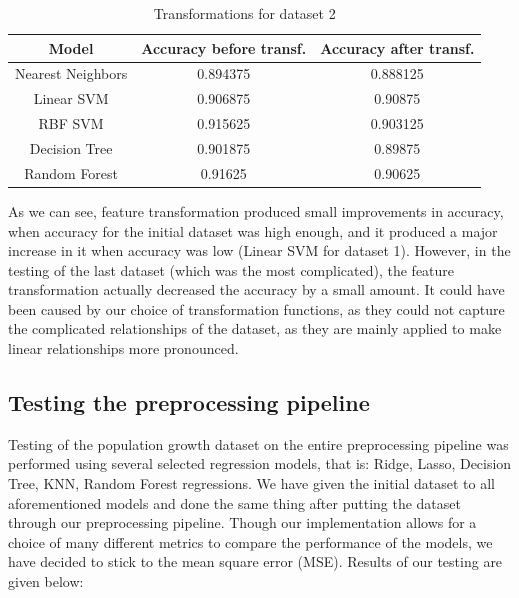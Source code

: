 \documentclass[conference]{IEEEtran}
\begin{document}
\begin{table}[htbp]
	\caption{Transformations for dataset 2}
	\begin{center}
		\begin{tabular}{|c|c|c|}
			\hline
			\textbf{Model}&\textbf{Accuracy before transf.}&\textbf{Accuracy after transf.} \\
			\hline
			Nearest Neighbors&0.894375&0.888125 \\
			\hline
			Linear SVM&0.906875&0.90875 \\
			\hline
			RBF SVM&0.915625&0.903125 \\
			\hline
			Decision Tree&0.901875&0.89875 \\
			\hline
			Random Forest&0.91625&0.90625 \\
			\hline
		\end{tabular}
		\label{tab4}
	\end{center}
\end{table}

As we can see, feature transformation produced small improvements in accuracy, when accuracy for the initial dataset was high enough, and it produced a major increase in it when accuracy was low (Linear SVM for dataset 1). However, in the testing of the last dataset (which was the most complicated), the feature transformation actually decreased the accuracy by a small amount. It could have been caused by our choice of transformation functions, as they could not capture the complicated relationships of the dataset, as they are mainly applied to make linear relationships more pronounced. 

\subsection{Testing the preprocessing pipeline}

Testing of the population growth dataset on the entire preprocessing pipeline was performed using several selected regression models, that is: Ridge, Lasso, Decision Tree, KNN, Random Forest regressions. We have given the initial dataset to all aforementioned models and done the same thing after putting the dataset through our preprocessing pipeline. Though our implementation allows for a choice of many different metrics to compare the performance of the models, we have decided to stick to the mean square error (MSE). Results of our testing are given below:
\end{document}

